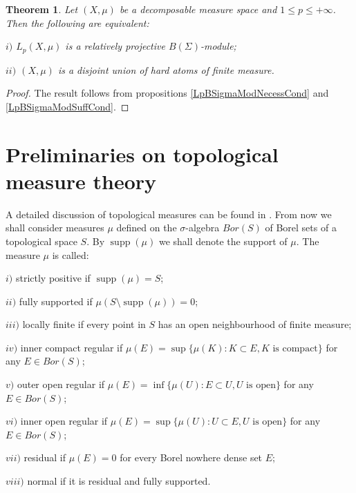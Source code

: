 \documentclass[12pt]{article}
\newtheorem{theorem}{Theorem}[section]
\begin{document}
\begin{theorem}\label{LpBSigmaModCrit} Let $(X,\mu)$ be a decomposable measure space and $1\leq p\leq +\infty$. Then the following are equivalent:

    $i)$ $L_p(X,\mu)$ is a relatively projective $B(\Sigma)$-module;

    $ii)$ $(X,\mu)$ is a disjoint union of hard atoms of finite measure.
\end{theorem}
\begin{proof} The result follows from propositions \ref{LpBSigmaModNecessCond} and \ref{LpBSigmaModSuffCond}.
\end{proof}


\section{Preliminaries on topological measure theory}
\label{SectionPreliminariesOnTopologicalMeasureTheory}

A detailed discussion of topological measures can be found in \cite{FremMeasTh4.1}. From now we shall consider measures $\mu$ defined on the $\sigma$-algebra $Bor(S)$ of Borel sets of a topological space $S$. By $\operatorname{supp}(\mu)$ we shall denote the support of $\mu$. The measure $\mu$ is called:

$i)$ strictly positive if $\operatorname{supp}(\mu)=S$;

$ii)$ fully supported if $\mu(S\setminus\operatorname{supp}(\mu))=0$;

$iii)$ locally finite if every point in $S$ has an open neighbourhood of finite measure;

$iv)$ inner compact regular if $\mu(E)=\sup\{\mu(K): K\subset E, K\mbox{ is compact}\}$ for any $E\in Bor(S)$;

$v)$ outer open regular if $\mu(E)=\inf\{\mu(U): E\subset U, U\mbox{ is open}\}$ for any $E\in Bor(S)$;

$vi)$ inner open regular if $\mu(E)=\sup\{\mu(U): U\subset E, U\mbox{ is open}\}$ for any $E\in Bor(S)$;

$vii)$ residual if $\mu(E)=0$ for every Borel nowhere dense set $E$;

$viii)$ normal if it is residual and fully supported.
\end{document}
